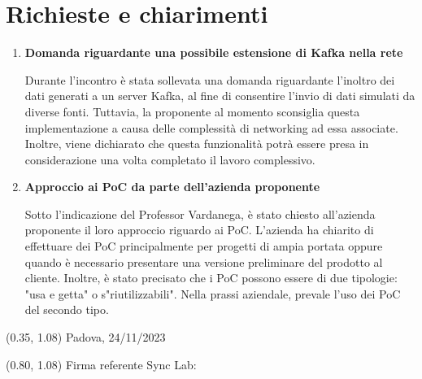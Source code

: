 \documentclass{article}
\begin{document}
\section{Richieste e chiarimenti}
\begin{enumerate}
    \item \textbf{Domanda riguardante una possibile estensione di Kafka nella rete}
    
    Durante l'incontro è stata sollevata una domanda riguardante l'inoltro dei dati generati a un server Kafka, al fine di consentire l'invio di dati simulati da diverse fonti. Tuttavia, la proponente al momento sconsiglia questa implementazione a causa delle complessità di networking ad essa associate.  
    Inoltre, viene dichiarato che questa funzionalità potrà essere presa in considerazione una volta completato il lavoro complessivo. 

    \item \textbf{Approccio ai PoC da parte dell'azienda proponente}
    
    Sotto l'indicazione del Professor Vardanega, è stato chiesto all’azienda proponente il loro approccio riguardo ai PoC. L'azienda ha chiarito di effettuare dei PoC principalmente per progetti di ampia portata oppure quando è necessario presentare una versione preliminare del prodotto al cliente. Inoltre, è stato precisato che i PoC possono essere di due tipologie: "usa e getta" o s"riutilizzabili". Nella prassi aziendale, prevale l'uso dei PoC del secondo tipo.  

\end{enumerate}
    
    
    
\begin{textblock*}{\textwidth}(0.35\textwidth, 1.08\textheight)
    Padova, 24/11/2023
\end{textblock*}

\begin{textblock*}{\textwidth}(0.80\textwidth, 1.08\textheight)
        Firma referente Sync Lab:
\end{textblock*}
\end{document}
